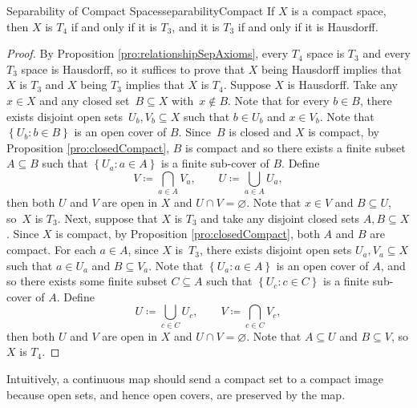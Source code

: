 \documentclass[math]{amznotes}
\theoremstyle{remark}
\begin{document}
\begin{probox}{Separability of Compact Spaces}{separabilityCompact}
    If $X$ is a compact space, then $X$ is $T_4$ if and only if it is $T_3$, and it is $T_3$ if and only if it is Hausdorff.
    \tcblower
    \begin{proof}
        By Proposition \ref{pro:relationshipSepAxioms}, every $T_4$ space is $T_3$ and every $T_3$ space is Hausdorff, so it suffices to prove that $X$ being Hausdorff implies that $X$ is $T_3$ and $X$ being $T_3$ implies that $X$ is $T_4$. Suppose $X$ is Hausdorff. Take any $x \in X$ and any closed set~$B \subseteq X$ with~$x \notin B$. Note that for every $b \in B$, there exists disjoint open sets~$U_b, V_b \subseteq X$ such that $b \in U_b$ and $x \in V_b$. Note that $\left\{U_b \colon b \in B\right\}$ is an open cover of $B$. Since~$B$ is closed and $X$ is compact, by Proposition \ref{pro:closedCompact}, $B$ is compact and so there exists a finite subset $A \subseteq B$ such that $\left\{U_a \colon a \in A\right\}$ is a finite sub-cover of $B$. Define 
        \begin{equation*}
            V \coloneqq \bigcap_{a \in A} V_a, \qquad U \coloneqq \bigcup_{a \in A} U_a,
        \end{equation*}
        then both $U$ and $V$ are open in $X$ and $U \cap V = \varnothing$. Note that $x \in V$ and $B \subseteq U$, so~$X$ is $T_3$. Next, suppose that $X$ is $T_3$ and take any disjoint closed sets $A, B \subseteq X$. Since $X$ is compact, by Proposition \ref{pro:closedCompact}, both $A$ and $B$ are compact. For each $a \in A$, since $X$ is~$T_3$, there exists disjoint open sets $U_a, V_a \subseteq X$ such that $a \in U_a$ and $B \subseteq V_a$. Note that $\left\{U_a \colon a \in A\right\}$ is an open cover of $A$, and so there exists some finite subset $C \subseteq A$ such that $\left\{U_c \colon c \in C\right\}$ is a finite sub-cover of $A$. Define 
        \begin{equation*}
            U \coloneqq \bigcup_{c \in C} U_c, \qquad V \coloneqq \bigcap_{c \in C} V_c,
        \end{equation*}
        then both $U$ and $V$ are open in $X$ and $U \cap V = \varnothing$. Note that $A \subseteq U$ and $B \subseteq V$, so $X$ is $T_4$.
    \end{proof}
\end{probox}
Intuitively, a continuous map should send a compact set to a compact image because open sets, and hence open covers, are preserved by the map.
\end{document}
